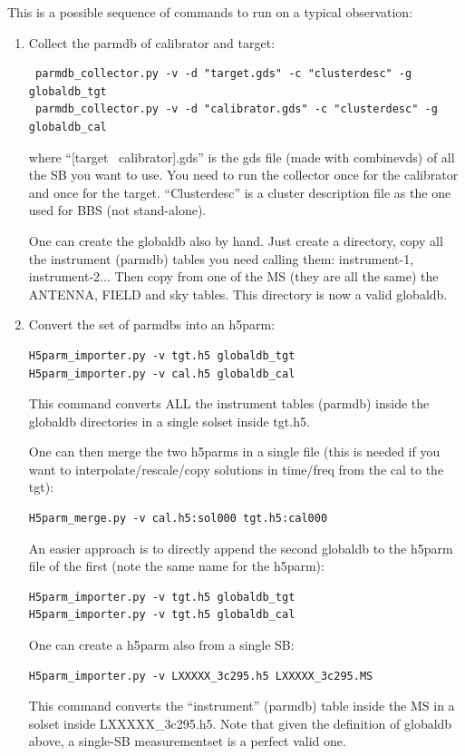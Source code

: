 This is a possible sequence of commands to run \losoto{} on a typical observation:
\begin{enumerate}

\item Collect the parmdb of calibrator and target:
\begin{verbatim}
 parmdb_collector.py -v -d "target.gds" -c "clusterdesc" -g globaldb_tgt
 parmdb_collector.py -v -d "calibrator.gds" -c "clusterdesc" -g globaldb_cal
\end{verbatim}
where ``[target \textbar\ calibrator].gds'' is the gds file (made with combinevds) of all the SB you want to use. You need to run the collector once for the calibrator and once for the target. ``Clusterdesc'' is a cluster description file as the one used for BBS (not stand-alone).

One can create the globaldb also by hand. Just create a directory, copy all the instrument (parmdb) tables you need calling them: instrument-1, instrument-2... Then copy from one of the MS (they are all the same) the ANTENNA, FIELD and sky tables. This directory is now a valid globaldb.

\item Convert the set of parmdbs into an h5parm:
\begin{verbatim}
H5parm_importer.py -v tgt.h5 globaldb_tgt
H5parm_importer.py -v cal.h5 globaldb_cal
\end{verbatim}
This command converts ALL the instrument tables (parmdb) inside the globaldb directories in a single solset inside tgt.h5.

One can then merge the two h5parms in a single file (this is needed if you want to interpolate/rescale/copy solutions in time/freq from the cal to the tgt):
\begin{verbatim}
H5parm_merge.py -v cal.h5:sol000 tgt.h5:cal000
\end{verbatim}

An easier approach is to directly append the second globaldb to the h5parm file of the first (note the same name for the h5parm):
\begin{verbatim}
H5parm_importer.py -v tgt.h5 globaldb_tgt
H5parm_importer.py -v tgt.h5 globaldb_cal
\end{verbatim}

One can create a h5parm also from a single SB:
\begin{verbatim}
H5parm_importer.py -v LXXXXX_3c295.h5 LXXXXX_3c295.MS
\end{verbatim}
This command converts the ``instrument'' (parmdb) table inside the MS in a solset inside LXXXXX\_3c295.h5. Note that given the definition of globaldb above, a single-SB measurementset is a perfect valid one.


\end{enumerate}
